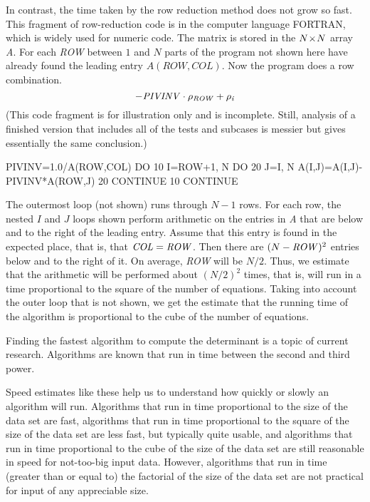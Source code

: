 In contrast, the time taken by the row reduction method does not grow so fast.
This fragment of row-reduction code is
in the computer language FORTRAN, which is widely used for numeric code.
The matrix is stored in the $N \! \times \! N$ array \textit{A}. 
For each \textit{ROW} between $1$ and $N$ parts of the program not shown here
have already found the leading entry $A(ROW,COL)$.
Now the program does a row combination.
\begin{equation*}
  -\text{\textit{PIVINV}}\cdot \rho_{\text{\textit{ROW}}}
      +\rho_{\text{\textit{i}}}
\end{equation*}
(This code fragment is for illustration only and is incomplete.
Still, analysis of a finished version that includes all of the tests
and subcases is messier but gives essentially the same conclusion.)
\begin{computercode}
PIVINV=1.0/A(ROW,COL)
DO 10 I=ROW+1, N
   DO 20 J=I, N
      A(I,J)=A(I,J)-PIVINV*A(ROW,J)
   20 CONTINUE
10 CONTINUE
\end{computercode} 
The outermost loop (not shown) runs through $N-1$ rows.
For each row, 
the nested $I$ and $J$ loops shown perform arithmetic on the entries
in \textit{A} that are below and to the right of the leading entry.
Assume that this entry is found in the expected place, that is, 
that $\text{\textit{COL}}=\text{\textit{ROW}}$.
Then there are $(N-\text{\textit{ROW}})^2$ entries 
below and to the right of it.
On average, \textit{ROW} will be $N/2$.
Thus, we estimate that the arithmetic will be performed  
about $(N/2)^2$ times,
that is, will run in a time proportional to the square of the number
of equations.
Taking into account the outer loop that is not shown, we get
the estimate that the running time of the algorithm
is proportional to the cube of the number of equations.

Finding the fastest algorithm to compute the determinant 
is a topic of current research.
Algorithms are known that run in time between the second and third power.

Speed estimates like these help us to understand how quickly or
slowly an algorithm will run.
Algorithms that run in time proportional to the size of the 
data set are fast, algorithms that run in time proportional to the
square of the size of the data set are less fast, but typically quite
usable, and algorithms that run in time proportional to the cube of
the size of the data set are still reasonable in speed for
not-too-big input data. 
However, algorithms that run in time (greater than or equal to) the factorial
of the size of the data set are not practical for input of any
appreciable size.

